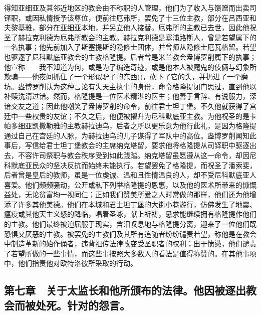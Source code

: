 得知亚细亚及其邻近地区的教会由不称职的人管理，他们为了收入与馈赠而出卖司铎职，或因私情授予该尊位，便前往厄弗所，罢免了十三位主教，部分在吕西亚和夫黎基雅，部分在亚细亚本地，并另立他人接替。厄弗所的主教已去世，因此他祝圣了赫拉克利德为厄弗所教会的主教。赫拉克利德是塞浦路斯人，曾是若望属下的一名执事；他先前加入了斯塞提斯的隐修士团体，并曾师从隐修士厄瓦格留。若望也驱逐了尼科默底亚教会的主教格隆提。后者曾是米兰教会盎博罗削属下的执事；他宣称——我不知道为何，或是为了编造奇迹，或是他本人被魔鬼的伎俩与幻象所欺骗——他夜间抓住了一个形似驴子的东西()，砍下了它的头，并扔进了一个磨坊。盎博罗削认为这种言论有失天主执事的身份，命令格隆提闭门思过，直到他以补赎洗清过错。然而，格隆提是一位医术精湛的医生；他善于言辞、有说服力，深谙交友之道；因此他嘲笑了盎博罗削的命令，前往君士坦丁堡。不久他就获得了宫廷中一些权贵的友谊；不久之后，他便被擢升为尼科默底亚主教。为他祝圣的是卡帕多细亚凯撒勒雅的主教赫拉迪乌，后者之所以更乐意为他行此礼，是因为格隆提通过自己在宫廷的人脉，为赫拉迪乌的儿子谋得了军队中的高位。盎博罗削闻知此事后，写信给君士坦丁堡教会的主席纳克塔留，要求他将格隆提从司铎职中驱逐出去，不容许司祭职与教会秩序受到如此践踏。纳克塔留虽愿遵从这一命令，却因尼科默底亚民众的坚决反抗而始终未能执行。若望罢免了格隆提，而祝圣了潘索斐，后者曾是皇后的教师，虽是一位虔诚、温和且性情温良的人，却不受尼科默底亚人喜爱。他们频频骚动，公开或私下列举格隆提的恩惠，以及他的医术所带来的慷慨益处，无论贫富均一视同仁；正如我们赞美所爱之人时常做的那样，他们还为他增添了许多其他美德。他们在本城和君士坦丁堡的大街小巷游行，仿佛发生了地震、瘟疫或其他天主义怒的降临，唱着圣咏，献上祈祷，恳求能继续拥有格隆提作他们的主教。他们最终被迫屈服于现实，含泪叹息地与格隆提分离，迎来了一位他们既恐惧又厌恶的主教。被罢免的主教们及其所有追随者纷纷谴责若望，称他是在教会中制造革新的始作俑者，违背祖传法律改变受圣职者的权利；出于愤懑，他们谴责了若望所做的一些事情，而这些事按照大多数人的看法是值得称赞的。在其他事项中，\newline{}他们指责他对欧特洛彼所采取的行动。\par


\subsection{第七章　关于太监长和他所颁布的法律。他因被逐出教会而被处死。针对的怨言。}

